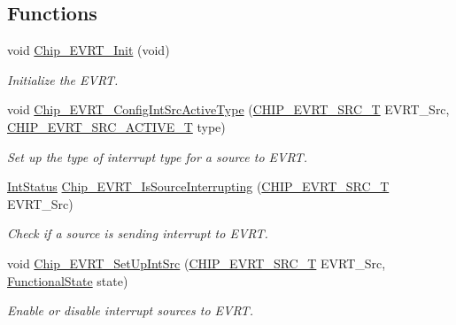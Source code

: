 \subsection*{Functions}
\begin{DoxyCompactItemize}
\item 
void \hyperlink{group___e_v_r_t__18_x_x__43_x_x_ga5320424173f844bb1484ae1523e3454a}{Chip\+\_\+\+E\+V\+R\+T\+\_\+\+Init} (void)
\begin{DoxyCompactList}\small\item\em Initialize the E\+V\+RT. \end{DoxyCompactList}\item 
void \hyperlink{group___e_v_r_t__18_x_x__43_x_x_ga4a317e0d292116144f6a6951c0bf25fa}{Chip\+\_\+\+E\+V\+R\+T\+\_\+\+Config\+Int\+Src\+Active\+Type} (\hyperlink{group___e_v_r_t__18_x_x__43_x_x_gaa43c01b5839b8ef001017d1d1150b16d}{C\+H\+I\+P\+\_\+\+E\+V\+R\+T\+\_\+\+S\+R\+C\+\_\+T} E\+V\+R\+T\+\_\+\+Src, \hyperlink{group___e_v_r_t__18_x_x__43_x_x_ga41e06d681302344e72fc1eca77f708b4}{C\+H\+I\+P\+\_\+\+E\+V\+R\+T\+\_\+\+S\+R\+C\+\_\+\+A\+C\+T\+I\+V\+E\+\_\+T} type)
\begin{DoxyCompactList}\small\item\em Set up the type of interrupt type for a source to E\+V\+RT. \end{DoxyCompactList}\item 
\hyperlink{group___l_p_c___types___public___types_gab7d263072f745b4f3913fb0afc434c4e}{Int\+Status} \hyperlink{group___e_v_r_t__18_x_x__43_x_x_ga48a251beebd268a78fd7ecad4a542a35}{Chip\+\_\+\+E\+V\+R\+T\+\_\+\+Is\+Source\+Interrupting} (\hyperlink{group___e_v_r_t__18_x_x__43_x_x_gaa43c01b5839b8ef001017d1d1150b16d}{C\+H\+I\+P\+\_\+\+E\+V\+R\+T\+\_\+\+S\+R\+C\+\_\+T} E\+V\+R\+T\+\_\+\+Src)
\begin{DoxyCompactList}\small\item\em Check if a source is sending interrupt to E\+V\+RT. \end{DoxyCompactList}\item 
void \hyperlink{group___e_v_r_t__18_x_x__43_x_x_ga4133d67f8986d48e1adbfee519423233}{Chip\+\_\+\+E\+V\+R\+T\+\_\+\+Set\+Up\+Int\+Src} (\hyperlink{group___e_v_r_t__18_x_x__43_x_x_gaa43c01b5839b8ef001017d1d1150b16d}{C\+H\+I\+P\+\_\+\+E\+V\+R\+T\+\_\+\+S\+R\+C\+\_\+T} E\+V\+R\+T\+\_\+\+Src, \hyperlink{group___l_p_c___types___public___types_gac9a7e9a35d2513ec15c3b537aaa4fba1}{Functional\+State} state)
\begin{DoxyCompactList}\small\item\em Enable or disable interrupt sources to E\+V\+RT. \end{DoxyCompactList}\item 

\end{DoxyCompactItemize}
